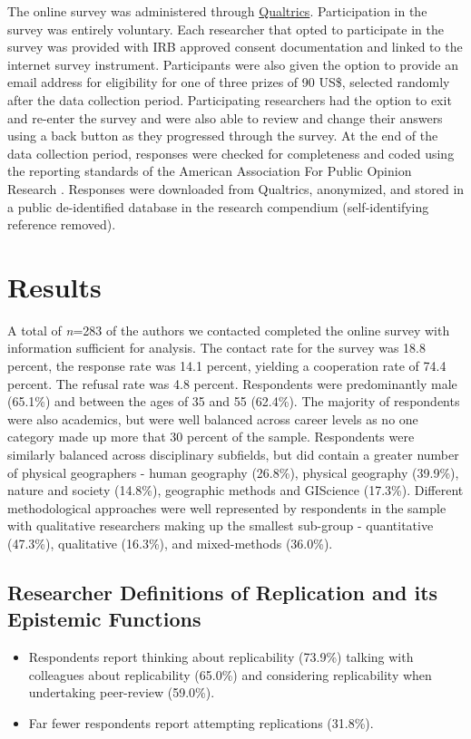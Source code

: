 \documentclass[]{interact}
\theoremstyle{plain}%
\theoremstyle{definition}
\theoremstyle{remark}
\begin{document}
The online survey was administered through \href{https://www.qualtrics.com/}{Qualtrics}. 
Participation in the survey was entirely voluntary. 
Each researcher that opted to participate in the survey was provided with IRB approved consent documentation and linked to the internet survey instrument. 
Participants were also given the option to provide an email address for eligibility for one of three  prizes of 90 US\$, selected randomly after the data collection period.
Participating researchers had the option to exit and re-enter the survey and were also able to review and change their answers using a back button as they progressed through the survey.
At the end of the data collection period, responses were checked for completeness and coded using the reporting standards of the American Association For Public Opinion Research \citep{aaporstandards}.
Responses were downloaded from Qualtrics, anonymized, and stored in a public de-identified database in the research compendium (self-identifying reference removed).


\section*{Results}
A total of \textit{n}=283 of the authors we contacted completed the online survey with information sufficient for analysis. 
The contact rate for the survey was 18.8 percent, the response rate was 14.1 percent, yielding a cooperation rate of 74.4 percent. 
The refusal rate was 4.8 percent.
Respondents were predominantly male (65.1\%) and between the ages of 35 and 55 (62.4\%). 
The majority of respondents were also academics, but were well balanced across career levels as no one category made up more that 30 percent of the sample.
Respondents were similarly balanced across disciplinary subfields, but did contain a greater number of physical geographers  - human geography (26.8\%), physical geography (39.9\%), nature and society (14.8\%), geographic methods and GIScience (17.3\%). 
Different methodological approaches were well represented by respondents in the sample with qualitative researchers making up the smallest sub-group  - quantitative (47.3\%), qualitative (16.3\%), and mixed-methods (36.0\%).

\subsection*{Researcher Definitions of Replication and its Epistemic Functions}
\begin{itemize}
    \item Respondents report thinking about replicability (73.9\%) talking with colleagues about replicability (65.0\%) and considering replicability when undertaking peer-review (59.0\%). 
    \item Far fewer respondents report attempting replications (31.8\%). 
\end{itemize}
\end{document}
